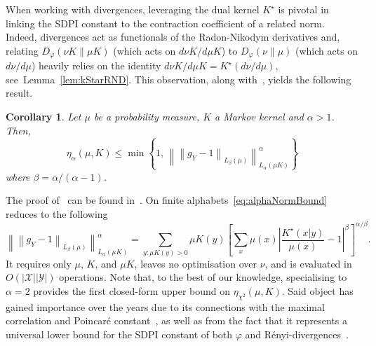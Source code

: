 \documentclass[11pt]{article}
\newcommand{\X}{\mathcal{X}}
\newcommand{\Y}{\mathcal{Y}}
\theoremstyle{plain}
\newtheorem{corollary}{Corollary}[section]
\theoremstyle{remark}
\begin{document}
When working with divergences, leveraging the dual kernel $K^\star$ is pivotal in linking the SDPI constant to the contraction coefficient of a related norm. Indeed, divergences act as functionals of the Radon-Nikodym derivatives and, relating $D_\varphi(\nu K\|\mu K)$ (which acts on $d\nu K/d\mu K$) to $D_\varphi(\nu\|\mu)$ (which acts on $d\nu/d\mu$) heavily relies on the identity $d\nu K/d\mu K = K^\star (d\nu/d\mu)$, see~Lemma~\ref{lem:kStarRND}. This observation, along with~,  yields the following result.
\begin{corollary}\label{cor:chiSquareBound}
    Let $\mu$ be a probability measure, $K$ a Markov kernel and $\alpha>1$. Then,
    \begin{equation}
        \eta_{\alpha}(\mu, K ) \leq \min\left\{
1,\,
\left\lVert
\left\lVert g_Y-1\right\rVert_{L_\beta(\mu)}
\right\rVert_{L_\alpha(\mu K)}^\alpha\right\} \label{eq:alphaNormBound}
    \end{equation}
    where $\beta=\alpha/(\alpha-1)$. %
\end{corollary}
The proof of~ can be found in~.
On finite alphabets~\eqref{eq:alphaNormBound} reduces to the following
\begin{equation}
\left\lVert
\left\lVert g_Y-1\right\rVert_{L_\beta(\mu)}
\right\rVert_{L_\alpha(\mu K)}^\alpha =\sum_{y:\mu K(y)>0}\mu K(y)
\left[
\sum_x\mu(x)
\left|
\frac{K^\star(x|y)}{\mu(x)}-1
\right|^\beta
\right]^{\alpha/\beta}.
\label{eq:finiteBalpha}
\end{equation}
It requires only $\mu$, $K$, and $\mu K$, leaves no optimisation over
$\nu$, and is evaluated in $O(|\X||\Y|)$ operations. 
Note that, to the best of our knowledge, specialising  to $\alpha=2$ provides the first closed-form upper bound on $\eta_{\chi^2}(\mu, K)$. Said object has gained importance over the years due to its connections with the maximal correlation and Poincaré constant~\cite{sdpiRaginsky}, as well as from the fact that it represents a universal lower bound for the SDPI constant of both $\varphi$ and R\'enyi-divergences~\cite{sdpiRaginsky, jin2024properties}.
\end{document}
